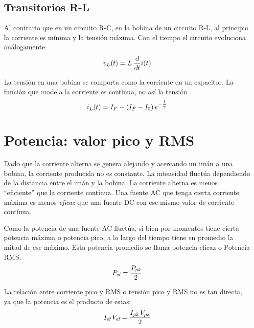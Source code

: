 \documentclass[a5paper,12pt,twoside]{book}
\begin{document}
\begin{center}
    \def\svgwidth{\linewidth}
    
\end{center}


\subsection*{Transitorios R-L}

Al contrario que en un circuito R-C, en la bobina de un circuito R-L, al principio la corriente es mínima y la tensión máxima. Con el tiempo el circuito evoluciona análogamente.
\begin{equation*}
    v_L(t) = L \, \frac{\textsl{d}}{\textsl{d} t} i(t)
\end{equation*}

La tensión en una bobina se comporta como la corriente en un capacitor. La función que modela la corriente es contínua, no así la tensión.
\begin{equation*}
    i_L(t) = I_F - \left(I_F - I_0\right) e^{-\tfrac{t}{\tau}}
\end{equation*}


\section{Potencia: valor pico y RMS}

Dado que la corriente alterna se genera alejando y acercando un imán a una bobina, la corriente producida no es constante.
La intensidad fluctúa dependiendo de la distancia entre el imán y la bobina.
La corriente alterna es menos ``eficiente'' que la corriente contínua.
Una fuente AC que tenga cierta corriente máxima es menos \emph{eficaz} que una fuente DC con ese mismo valor de corriente contínua.

\begin{center}
    \def\svgwidth{0.8\linewidth}
    
\end{center}

Como la potencia de una fuente AC fluctúa, si bien por momentos tiene cierta potencia máxima o potencia pico, a lo largo del tiempo tiene en promedio la mitad de ese máximo. Esta potencia promedio se llama potencia eficaz o Potencia RMS.
\begin{equation*}
    {{{P}_\textsl{{ef}}}} = \frac{{{{P}_\textsl{{pk}}}}}{2}
\end{equation*}

La relación entre corriente pico y RMS o tensión pico y RMS no es tan directa, ya que la potencia es el producto de estas:
\begin{equation*}
    {{{I}_\textsl{{ef}}}} \, {{{V}_\textsl{{ef}}}} = \frac{{{{I}_\textsl{{pk}}}} \, {{{V}_\textsl{{pk}}}}}{2}
\end{equation*}
\end{document}
